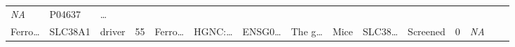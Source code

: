 \documentclass[
]{article}
\begin{document}
\begin{longtable}[]{@{}lllllllllllllll@{}}
\begin{minipage}[t]{0.05\columnwidth}
\emph{NA}\strut
\end{minipage} & \begin{minipage}[t]{0.05\columnwidth}\raggedright
P04637\strut
\end{minipage} & \begin{minipage}[t]{0.02\columnwidth}\raggedright
\ldots{}\strut
\end{minipage}\tabularnewline
\begin{minipage}[t]{0.05\columnwidth}\raggedright
Ferro\ldots{}\strut
\end{minipage} & \begin{minipage}[t]{0.05\columnwidth}\raggedright
SLC38A1\strut
\end{minipage} & \begin{minipage}[t]{0.04\columnwidth}\raggedright
driver\strut
\end{minipage} & \begin{minipage}[t]{0.02\columnwidth}\raggedright
55\strut
\end{minipage} & \begin{minipage}[t]{0.05\columnwidth}\raggedright
Ferro\ldots{}\strut
\end{minipage} & \begin{minipage}[t]{0.05\columnwidth}\raggedright
HGNC:\ldots{}\strut
\end{minipage} & \begin{minipage}[t]{0.05\columnwidth}\raggedright
ENSG0\ldots{}\strut
\end{minipage} & \begin{minipage}[t]{0.05\columnwidth}\raggedright
The g\ldots{}\strut
\end{minipage} & \begin{minipage}[t]{0.05\columnwidth}\raggedright
Mice\strut
\end{minipage} & \begin{minipage}[t]{0.05\columnwidth}\raggedright
SLC38\ldots{}\strut
\end{minipage} & \begin{minipage}[t]{0.05\columnwidth}\raggedright
Screened\strut
\end{minipage} & \begin{minipage}[t]{0.05\columnwidth}\raggedright
0\strut
\end{minipage} & \begin{minipage}[t]{0.05\columnwidth}\raggedright
\emph{NA}\strut
\end{minipage} & \begin{minipage}[t]{0.05\columnwidth}\raggedright

\end{minipage}
\end{longtable}
\end{document}
